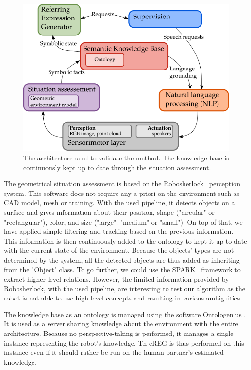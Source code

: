 \begin{figure}[h!]
\centering
\includegraphics[scale=0.6]{figures/chapter4/architecture.png}
\caption{\label{fig:chap4_archi} The architecture used to validate the method. The knowledge base is continuously kept up to date through the situation assessment.}
\end{figure}

The geometrical situation assessment is based on the Robosherlock~\cite{beetz_2015_robosherlock} perception system. This software does not require any a priori on the environment such as CAD model, mesh or training. With the used pipeline, it detects objects on a surface and gives information about their position, shape ("circular" or "rectangular"), color, and size ("large", "medium" or "small"). On top of that, we have applied simple filtering and tracking based on the previous information. This information is then continuously added to the ontology to kept it up to date with the current state of the environment. Because the objects' types are not determined by the system, all the detected objects are thus added as inheriting from the "Object" class. To go further, we could use the SPARK~\cite{milliez_2014_framework} framework to extract higher-level relations. However, the limited information provided by Robosherlock, with the used pipeline, are interesting to test our algorithm as the robot is not able to use high-level concepts and resulting in various ambiguities.

The knowledge base as an ontology is managed using the software Ontologenius \cite{sarthou_2019_ontologenius}. It is used as a server sharing knowledge about the environment with the entire architecture. Because no perspective-taking is performed, it manages a single instance representing the robot's knowledge. Th eREG is thus performed on this instance even if it should rather be run on the human partner's estimated knowledge.

